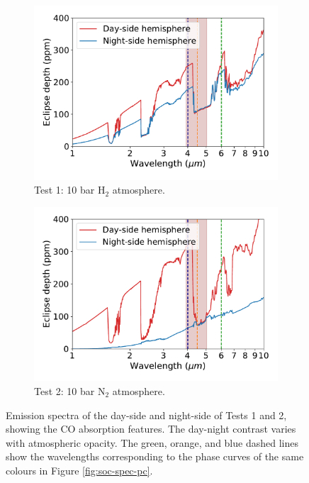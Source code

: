 \begin{figure}
  \centering
  \begin{subfigure}[t]{0.48\textwidth}
    \includegraphics[width=\textwidth]{figures/soc-lava-planets/h2-emission-spec.pdf}
    \caption{Test 1: 10 bar H$_{2}$ atmosphere.}\label{fig:soc-tp-h2}
  \end{subfigure}
\quad
  \begin{subfigure}[t]{0.48\textwidth}
    \includegraphics[width=\textwidth]{figures/soc-lava-planets/n2-emission-spec.pdf}
    \caption{Test 2: 10 bar N$_{2}$ atmosphere.}\label{fig:soc-tp-n2}
  \end{subfigure}
  \caption{Emission spectra of the day-side and night-side of Tests 1 and 2, showing the CO absorption features. The day-night contrast varies with atmospheric opacity. The green, orange, and blue dashed lines show the wavelengths corresponding to the phase curves of the same colours in Figure \ref{fig:soc-spec-pc}.}
  \label{fig:soc-emission-spec}
\end{figure}



